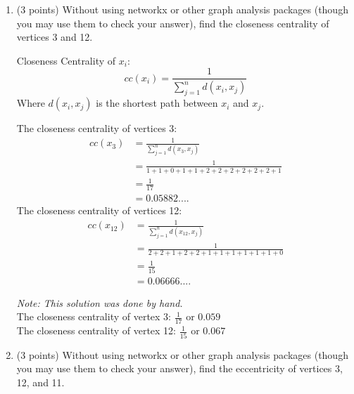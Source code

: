 \documentclass[11pt]{article}
\begin{document}
\begin{enumerate}

    \item (3 points) Without using networkx or other graph analysis packages
    (though you may use them to check your answer), find the closeness
    centrality of vertices 3 and 12.
    \begin{tcolorbox}[width=\linewidth,colback=yellow!5,colframe=yellow!75!black!75,title=Notes]
        Closeness Centrality of $x_i$:
        $$cc(x_{i}) = \frac{1}{\sum_{j=1}^{n} d( x_i , x_j )}$$
        Where $d( x_i , x_j )$ is the shortest path between $x_i$ and $x_j$.
    \end{tcolorbox}
    The closeness centrality of vertices 3:
    \begin{align*}
        cc(x_{3}) &= \frac{1}{\sum_{j=1}^{n} d( x_3 , x_j )} \\
        &= \frac{1}{1 + 1 + 0 + 1 + 1 + 2 + 2 + 2 + 2 + 2 + 2 + 1} \\
        &= \frac{1}{17} \\
        &= 0.05882....
    \end{align*}
    The closeness centrality of vertices 12:
    \begin{align*}
        cc(x_{12}) &= \frac{1}{\sum_{j=1}^{n} d( x_{12} , x_j )} \\
        &= \frac{1}{2+2+1+2+2+1+1+1+1+1+1+0} \\
        &= \frac{1}{15} \\
        &= 0.06666....
    \end{align*}
    \begin{tcolorbox}[width=\linewidth,title=Problem 1 Answer - Closeness Centrality]
        \textit{Note: This solution was done by hand.}\vspace{5pt} \\
        The closeness centrality of vertex 3: $\frac{1}{17}$ or $0.059$ \\
        The closeness centrality of vertex 12: $\frac{1}{15}$ or $0.067$
    \end{tcolorbox}
    \item (3 points) Without using networkx or other graph analysis packages
    (though you may use them to check your answer), find the eccentricity of
    vertices 3, 12, and 11.
    \begin{tcolorbox}[width=\linewidth,colback=yellow!5,colframe=yellow!75!black!75,title=Notes]

\end{tcolorbox}
\end{enumerate}
\end{document}
